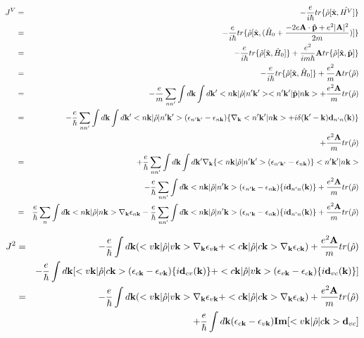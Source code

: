 \documentclass[aps,prb,preprint]{revtex4-1}
\begin{document}
\begin{appendix}
\begin{eqnarray}
J^V&=&  -\frac{e}{i \hbar} tr\{\hat{\rho}[\hat{\bf x},\hat{H^V} ]\} \nonumber \\
&=&  -\frac{e}{i \hbar} tr\{\hat{\rho}[\hat{\bf x},(\hat{H}_0 +\frac{- 2e{\bf A} \cdot {\bf \hat{p}} + e^2 |{\bf A}|^2}{2m})]\} \nonumber \\
&=&  -\frac{e}{i \hbar} tr\{\hat{\rho}[\hat{\bf x},\hat{H}_0]\} + \frac{e^2}{i m \hbar} {\bf A} tr\{\hat{\rho}[\hat{\bf x},\hat{\bf p}]\} \nonumber \\
&=&  -\frac{e}{i \hbar} tr\{\hat{\rho}[\hat{\bf x},\hat{H}_0]\} + \frac{e^2}{m} {\bf A} tr(\hat{\rho}) \nonumber \\
&=&   - \frac{e}{m} \sum_{nn'}\int d{\bf k} \int d{\bf k'} <n{\bf k}|\hat{\rho}|n'{\bf k'}><n'{\bf k'}|\hat{\bf p}|n{\bf k}> +\frac{e^2{\bf A}}{m}tr(\hat{\rho}) \nonumber \\
&=&   -\frac{e}{\hbar} \sum_{nn'} \int d{\bf k}\int d{\bf k'} <n{\bf k}|\hat{\rho}|n'{\bf k'}> (\epsilon_{n'{\bf k'}}-\epsilon_{n{\bf k}})\{\nabla_{\bf k} <n'{\bf k'}|n{\bf k}> + i \delta({\bf k'-k}) {\bf d}_{n'n}({\bf k})\}  \nonumber \\
&& + \frac{e^2{\bf A}}{m}tr(\hat{\rho}) \nonumber \\
&=&   +\frac{e}{\hbar} \sum_{nn'} \int d{\bf k}\int d{\bf k'} \nabla_{\bf k}\{<n{\bf k}|\hat{\rho}|n'{\bf k'}> (\epsilon_{n'{\bf k'}}-\epsilon_{n{\bf k}})\} <n'{\bf k'}|n{\bf k}>   \nonumber \\
&&   -\frac{e}{\hbar} \sum_{nn'} \int d{\bf k} <n{\bf k}|\hat{\rho}|n'{\bf k}> (\epsilon_{n'{\bf k}}-\epsilon_{n{\bf k}}) \{i {\bf d}_{n'n}({\bf k})\}  + \frac{e^2{\bf A}}{m}tr(\hat{\rho}) \nonumber \\
&=&  \frac{e}{\hbar} \sum_{n} \int d{\bf k} <n{\bf k}|\hat{\rho}|n{\bf k}> \nabla_{\bf k} \epsilon_{n{\bf k}}  -\frac{e}{\hbar} \sum_{nn'} \int d{\bf k} <n{\bf k}|\hat{\rho}|n'{\bf k}> (\epsilon_{n'{\bf k}}-\epsilon_{n{\bf k}}) \{i {\bf d}_{n'n}({\bf k})\}  + \frac{e^2{\bf A}}{m}tr(\hat{\rho}) \nonumber \\
\end{eqnarray} 

\begin{eqnarray}
J^{2} &=&  -\frac{e}{\hbar} \int d{\bf k} (<v{\bf k}|\hat{\rho}|v{\bf k}> \nabla_{\bf k} \epsilon_{v{\bf k}} +<c{\bf k}|\hat{\rho}|c{\bf k}> \nabla_{\bf k} \epsilon_{c{\bf k}} ) + \frac{e^2{\bf A}}{m}tr(\hat{\rho}) \nonumber \\
&& -\frac{e}{\hbar} \int d{\bf k} [ <v{\bf k}|\hat{\rho}|c{\bf k}> (\epsilon_{c{\bf k}}-\epsilon_{v{\bf k}}) \{i {\bf d}_{cv}({\bf k})\} + <c{\bf k}|\hat{\rho}|v{\bf k}> (\epsilon_{v{\bf k}}-\epsilon_{c{\bf k}}) \{i {\bf d}_{vc}({\bf k})\} ]  \nonumber \\
&=&  -\frac{e}{\hbar} \int d{\bf k} (<v{\bf k}|\hat{\rho}|v{\bf k}> \nabla_{\bf k} \epsilon_{v{\bf k}} +<c{\bf k}|\hat{\rho}|c{\bf k}> \nabla_{\bf k} \epsilon_{c{\bf k}} ) + \frac{e^2{\bf A}}{m}tr(\hat{\rho}) \nonumber \\
&& + \frac{e}{\hbar} \int d{\bf k} (\epsilon_{c{\bf k}}-\epsilon_{v{\bf k}}) {\bf Im}[ <v{\bf k}|\hat{\rho}|c{\bf k}>{\bf d}_{vc} ]  
\end{eqnarray} 


\end{appendix}
\end{document}

